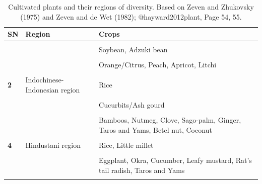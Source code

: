 \documentclass[
  ignorenonframetext,
  aspectratio=169]{beamer}
\begin{document}
\begin{frame}{}
\protect\hypertarget{section-17}{}
\begin{table}

\caption{\label{tab:diversity-region1}Cultivated plants and their regions of diversity. Based on Zeven and Zhukovsky (1975) and Zeven and de Wet (1982); @hayward2012plant, Page 54, 55.}
\centering
\fontsize{6}{8}\selectfont
\begin{tabular}[t]{>{\raggedright\arraybackslash}p{3em}>{\raggedright\arraybackslash}p{14em}>{\raggedright\arraybackslash}p{32em}}
\toprule
SN & Region & Crops\\
\midrule
\textbf{\cellcolor{gray!6}{1}} & \cellcolor{gray!6}{Chinese-Japanese region} & \cellcolor{gray!6}{Prosomillet, Foxtail millet, Naked oat}\\
\textbf{} &  & Soybean, Adzuki bean\\
\textbf{\cellcolor{gray!6}{}} & \cellcolor{gray!6}{} & \cellcolor{gray!6}{Leafy mustard}\\
\textbf{} &  & Orange/Citrus, Peach, Apricot, Litchi\\
\textbf{\cellcolor{gray!6}{}} & \cellcolor{gray!6}{} & \cellcolor{gray!6}{Bamboo, Ramie, Tung oil tree, Tea}\\
\addlinespace
\textbf{2} & Indochinese-Indonesian region & Rice\\
\textbf{\cellcolor{gray!6}{}} & \cellcolor{gray!6}{} & \cellcolor{gray!6}{Rice bean, Winged bean}\\
\textbf{} &  & Cucurbits/Ash gourd\\
\textbf{\cellcolor{gray!6}{}} & \cellcolor{gray!6}{} & \cellcolor{gray!6}{Mango, Banana, Rambutan, Durian, Bread fruit, Citrus/Lime, Grapefruit}\\
\textbf{} &  & Bamboos, Nutmeg, Clove, Sago-palm, Ginger, Taros and Yams, Betel nut, Coconut\\
\addlinespace
\textbf{\cellcolor{gray!6}{3}} & \cellcolor{gray!6}{Australian region} & \cellcolor{gray!6}{Eucalyptus, Acacia, Macadamia nut}\\
\textbf{4} & Hindustani region & Rice, Little millet\\
\textbf{\cellcolor{gray!6}{}} & \cellcolor{gray!6}{} & \cellcolor{gray!6}{Black gram, Green gram, Moth bean, Rice bean, Dolichos bean, Pigeonpea, Cowpea, Chickpea, Horsegram, Jute}\\
\textbf{} &  & Eggplant, Okra, Cucumber, Leafy mustard, Rat's tail radish, Taros and Yams\\
\textbf{\cellcolor{gray!6}{}} & \cellcolor{gray!6}{} & \cellcolor{gray!6}{Citrus, Banana, Mango, Sunhemp, Tree cotton}\\
\bottomrule
\end{tabular}
\end{table}
\end{frame}
\end{document}
